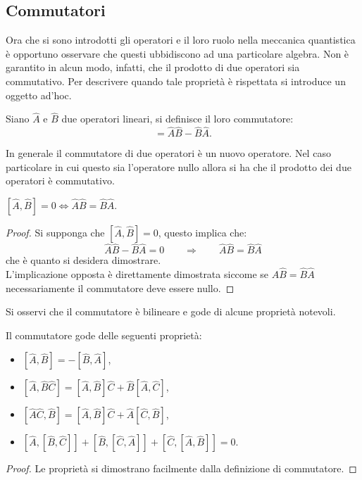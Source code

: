 \subsection{Commutatori}
Ora che si sono introdotti gli operatori e il loro ruolo nella meccanica quantistica è opportuno osservare che questi ubbidiscono ad una particolare algebra. Non è garantito in alcun modo, infatti, che il prodotto di due operatori sia commutativo. Per descrivere quando tale proprietà è rispettata si introduce un oggetto ad'hoc.
\begin{definition}[Commutatori]
    Siano $\hat A$ e $\hat B$ due operatori lineari, si definisce il loro commutatore:
    \begin{equation*}
        [\hat A,\hat B]=\hat A\hat B-\hat B\hat A.
    \end{equation*}
\end{definition}
In generale il commutatore di due operatori è un nuovo operatore. Nel caso particolare in cui questo sia l'operatore nullo allora si ha che il prodotto dei due operatori è commutativo.
\begin{proposition}
    $[\hat A,\hat B]=0\Longleftrightarrow \hat A\hat B=\hat B\hat A.$
\end{proposition}
\begin{proof}
    Si supponga che $[\hat A,\hat B]=0$, questo implica che:
    \begin{equation*}
        \hat A\hat B-\hat B\hat A=0\qquad\Rightarrow\qquad\hat A\hat B=\hat B\hat A
    \end{equation*}
    che è quanto si desidera dimostrare.\\
    L'implicazione opposta è direttamente dimostrata siccome se $\hat A\hat B=\hat B\hat A$ necessariamente il commutatore deve essere nullo.
\end{proof}
Si osservi che il commutatore è bilineare e gode di alcune proprietà notevoli.
\begin{proposition}
    Il commutatore gode delle seguenti proprietà:
    \begin{itemize}
        \item $[\hat A,\hat B]=-[\hat B,\hat A]$,
        \item $[\hat A,\hat B\hat C]=[\hat A,\hat B]\hat C+\hat B[\hat A,\hat C]$,
        \item $[\hat A\hat C,\hat B]=[\hat A,\hat B]\hat C+\hat A[\hat C,\hat B]$,
        \item $[\hat A,[\hat B,\hat C]]+[\hat B,[\hat C,\hat A]]+[\hat C,[\hat A,\hat B]]=0$.
    \end{itemize}
    \begin{proof}
        Le proprietà si dimostrano facilmente dalla definizione di commutatore.
    \end{proof}
\end{proposition}
